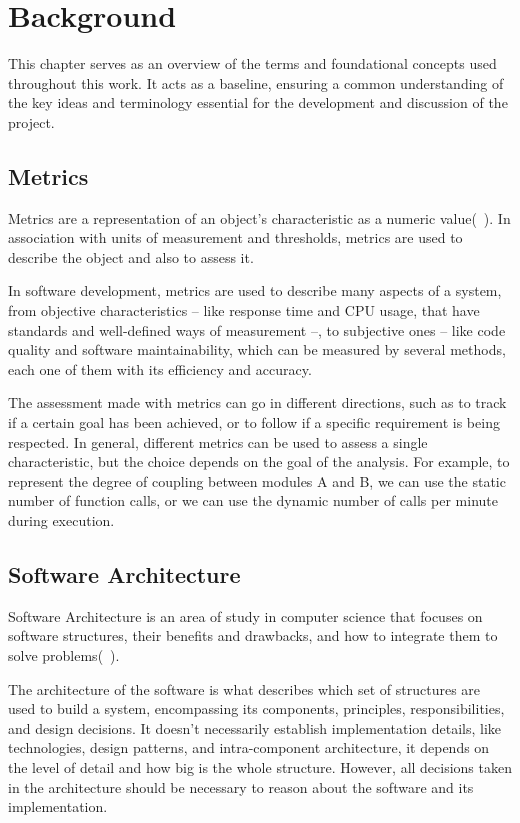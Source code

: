 \chapter{Background}
\label{cap:literature}

\enlargethispage{.5\baselineskip}

This chapter serves as an overview of the terms and foundational concepts used throughout this work. It acts as a baseline, ensuring a common understanding of the key ideas and terminology essential for the development and discussion of the project.

\section{Metrics}
\label{sec:metrics}
Metrics are a representation of an object’s characteristic as a numeric value(~\cite{OOMetrics}). In association with units of measurement and thresholds, metrics are used to describe the object and also to assess it.

In software development, metrics are used to describe many aspects of a system, from objective characteristics – like response time and CPU usage, that have standards and well-defined ways of measurement –, to subjective ones – like code quality and software maintainability, which can be measured by several methods, each one of them with its efficiency and accuracy.

The assessment made with metrics can go in different directions, such as to track if a certain goal has been achieved, or to follow if a specific requirement is being respected. In general, different metrics can be used to assess a single characteristic, but the choice depends on the goal of the analysis. For example, to represent the degree of coupling between modules A and B, we can use the static number of function calls, or we can use the dynamic number of calls per minute during execution.

\section{Software Architecture}
\label{sec:softarq}
Software Architecture is an area of study in computer science that focuses on software structures, their benefits and drawbacks, and how to integrate them to solve problems(~\cite{SoftArch}).

The architecture of the software is what describes which set of structures are used to build a system, encompassing its components, principles, responsibilities, and design decisions. It doesn't necessarily establish implementation details, like technologies, design patterns, and intra-component architecture, it depends on the level of detail and how big is the whole structure. However, all decisions taken in the architecture should be necessary to reason about the software and its implementation.

